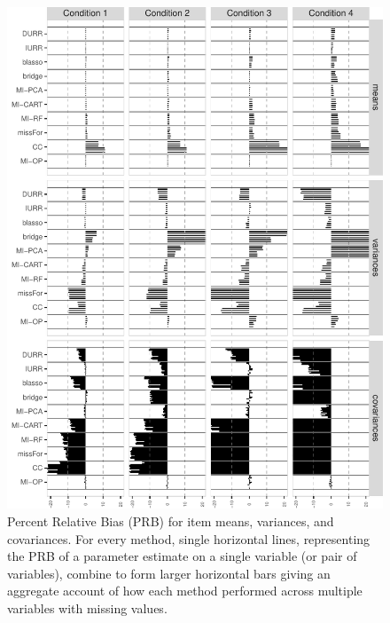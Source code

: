 \documentclass[11pt]{article}
\begin{document}
\begin{figure}
\centering
\includegraphics{../../output/graphs/exp1_bias.pdf}
\caption{\label{fig:exp1bias}
	Percent Relative Bias (PRB) for item means, variances, and covariances.
	For every method, single horizontal lines, representing the PRB of a parameter estimate on 
	a single variable (or pair of variables), combine to form larger horizontal bars giving an 
	aggregate account of how each method performed across multiple variables with missing values.
	}
\end{figure}
\end{document}
